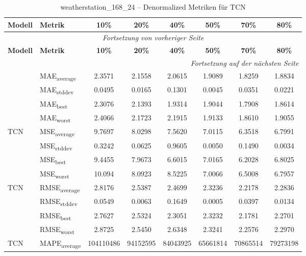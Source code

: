 {\small
\begin{longtable}{l l c c c c c c}
    \toprule
    \textbf{Modell} & \textbf{Metrik} & \textbf{10\%} & \textbf{20\%} & \textbf{40\%} & \textbf{50\%} & \textbf{70\%} & \textbf{80\%} \\
    \midrule
    \endfirsthead
    \multicolumn{8}{c}{\textit{Fortsetzung von vorheriger Seite}} \\
    \toprule
    \textbf{Modell} & \textbf{Metrik} & \textbf{10\%} & \textbf{20\%} & \textbf{40\%} & \textbf{50\%} & \textbf{70\%} & \textbf{80\%} \\
    \midrule
    \endhead
    \midrule
    \multicolumn{8}{r}{\textit{Fortsetzung auf der nächsten Seite}} \\
    \midrule
    \endfoot
    \bottomrule
    \caption{weatherstation_168_24 -- Denormalized Metriken für TCN}
    \label{tab:weatherstation_168_24_denormalized_tcn}
    \endlastfoot
\multirow{4}{*}{TCN} & MAE\textsubscript{average} & 2.3571 & 2.1558 & 2.0615 & 1.9089 & 1.8259 & 1.8834 \\
 & MAE\textsubscript{stddev} & 0.0495 & 0.0165 & 0.1301 & 0.0045 & 0.0351 & 0.0221 \\
 & MAE\textsubscript{best} & 2.3076 & 2.1393 & 1.9314 & 1.9044 & 1.7908 & 1.8614 \\
 & MAE\textsubscript{worst} & 2.4066 & 2.1723 & 2.1915 & 1.9133 & 1.8610 & 1.9055 \\
\cmidrule(lr){2-8}
\multirow{4}{*}{TCN} & MSE\textsubscript{average} & 9.7697 & 8.0298 & 7.5620 & 7.0115 & 6.3518 & 6.7991 \\
 & MSE\textsubscript{stddev} & 0.3242 & 0.0625 & 0.9605 & 0.0050 & 0.1490 & 0.0034 \\
 & MSE\textsubscript{best} & 9.4455 & 7.9673 & 6.6015 & 7.0165 & 6.2028 & 6.8025 \\
 & MSE\textsubscript{worst} & 10.094 & 8.0923 & 8.5225 & 7.0066 & 6.5008 & 6.7957 \\
\cmidrule(lr){2-8}
\multirow{4}{*}{TCN} & RMSE\textsubscript{average} & 2.8176 & 2.5387 & 2.4699 & 2.3236 & 2.2178 & 2.2836 \\
 & RMSE\textsubscript{stddev} & 0.0549 & 0.0063 & 0.1649 & 0.0005 & 0.0397 & 0.0134 \\
 & RMSE\textsubscript{best} & 2.7627 & 2.5324 & 2.3051 & 2.3232 & 2.1781 & 2.2701 \\
 & RMSE\textsubscript{worst} & 2.8725 & 2.5450 & 2.6348 & 2.3241 & 2.2576 & 2.2970 \\
\cmidrule(lr){2-8}
\multirow{4}{*}{TCN} & MAPE\textsubscript{average} & 104110486 & 94152595 & 84043925 & 65661814 & 70865514 & 79273198 \\

\end{longtable}}
